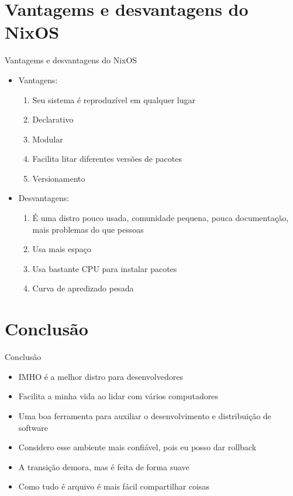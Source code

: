 \documentclass[presentation]{beamer}
\begin{document}
\section{Vantagems e desvantagens do NixOS}
\label{sec:orgad1ef40}
\begin{frame}[label={sec:orge614a84}]{Vantagems e desvantagens do NixOS}
\begin{itemize}
\item Vantagens:
\begin{enumerate}
\item Seu sistema é reproduzível em qualquer lugar
\item Declarativo
\item Modular
\item Facilita litar diferentes versões de pacotes
\item Versionamento
\end{enumerate}
\item Desvantagens:
\begin{enumerate}
\item É uma distro pouco usada, comunidade pequena, pouca documentação, mais problemas do que pessoas
\item Usa mais espaço
\item Usa bastante CPU para instalar pacotes
\item Curva de apredizado pesada
\end{enumerate}
\end{itemize}
\end{frame}

\section{Conclusão}
\label{sec:orgf6a389d}
\begin{frame}[label={sec:org00a7d16}]{Conclusão}
\begin{itemize}
\item IMHO é a melhor distro para desenvolvedores
\item Facilita a minha vida ao lidar com vários computadores
\item Uma boa ferramenta para auxiliar o desenvolvimento e distribuição de software
\item Considero esse ambiente mais confiável, pois eu posso dar rollback
\item A transição demora, mas é feita de forma suave
\item Como tudo é arquivo é mais fácil compartilhar coisas
\end{itemize}
\end{frame}
\end{document}
